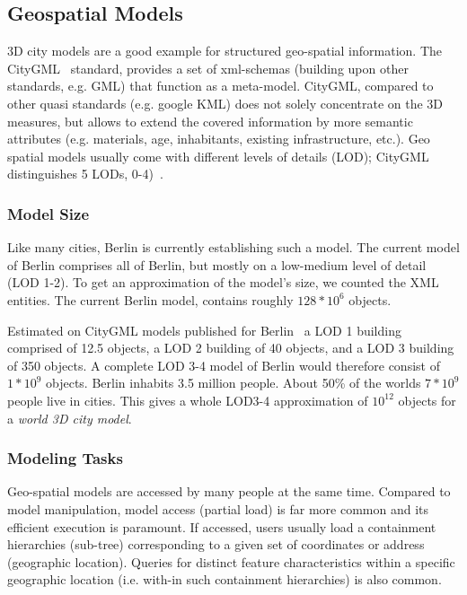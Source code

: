 \subsection{Geospatial Models}

3D city models are a good example for structured geo-spatial information. The CityGML~\cite{cityGML} standard, provides a set of xml-schemas (building upon other standards, e.g. GML) that function as a meta-model. CityGML, compared to other quasi standards (e.g. google KML) does not solely concentrate on the 3D measures, but allows to extend the covered information by more semantic attributes (e.g. materials, age, inhabitants, existing infrastructure, etc.). Geo spatial models usually come with different levels of details (LOD); CityGML distinguishes 5 LODs, 0-4)~\cite{cityGML}. 

\subsubsection{Model Size}
Like many cities, Berlin is currently establishing such a model. The current model of Berlin comprises all of Berlin, but mostly on a low-medium level of detail (LOD 1-2). To get an approximation of the model's size, we counted the XML entities. The current Berlin model, contains roughly $128*10^6$ objects. 

Estimated on CityGML models published for Berlin~\cite{berlinGML} a LOD 1 building comprised of 12.5 objects, a LOD 2 building of 40 objects, and a LOD 3 building of 350 objects. A complete LOD 3-4 model of Berlin would therefore consist of $1*10^9$ objects. Berlin inhabits 3.5 million people. About 50\% of the worlds $7*10^9$ people live in cities. This gives a whole LOD3-4 approximation of $10^{12}$ objects for a \emph{world 3D city model}.

\subsubsection{Modeling Tasks}
Geo-spatial models are accessed by many people at the same time. Compared to model manipulation, model access (partial load) is far more common and its efficient execution is paramount. If accessed, users usually load a containment hierarchies (sub-tree) corresponding to a given set of coordinates or address (geographic location). Queries for distinct feature characteristics within a specific geographic location (i.e. with-in such containment hierarchies) is also common. 



